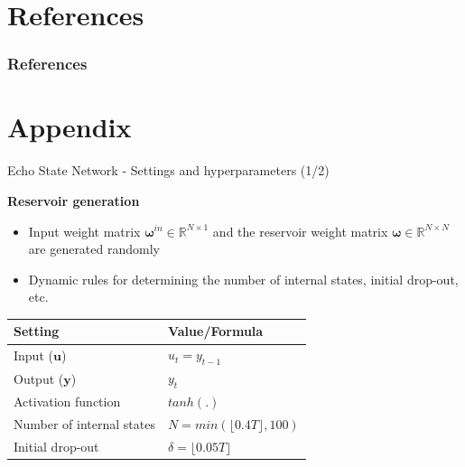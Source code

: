 \documentclass[aspectratio=169]{beamer}
\begin{document}
\section{References}

\begin{frame}[allowframebreaks]
    \frametitle{References}
    \nocite{*}
    \printbibliography[heading=none]
\end{frame}


\section{Appendix}

\begin{frame}[t]{Echo State Network  - Settings and hyperparameters (1/2)}
    \begin{minipage}[t]{0.3\textwidth}
        \vspace{0pt}
        \textbf{Reservoir generation}
        \begin{itemize}
        	\item Input weight matrix $\boldsymbol{\omega}^{in} \in \mathbb{R}^{N \times 1}$ and the reservoir weight matrix $\boldsymbol{\omega} \in \mathbb{R}^{N \times N}$ are generated randomly
        	\item Dynamic rules for determining the number of internal states, initial drop-out, etc.
        \end{itemize}
    \end{minipage}%
    \hfill
    \begin{minipage}[t]{0.7\textwidth}
        \vspace{0pt}
        	\begin{table}[ht]
        	\scriptsize
			\centering
				\begin{tabular}{ll}
				\toprule
				\textbf{Setting}                                    & \textbf{Value/Formula}               \\
				\midrule
				Input ($\mathbf{u}$)                                & $u_t = y_{t-1}$                            \\
				Output ($\mathbf{y}$)                               & $y_{t}$                              \\
				Activation function                                 & $tanh(.)$                            \\
				Number of internal states                           & $N = min(\lfloor 0.4T \rfloor, 100)$ \\
				Initial drop-out                                    & $\delta = \lfloor 0.05T \rfloor$     \\

\end{tabular}
\end{table}
\end{minipage}
\end{frame}
\end{document}
